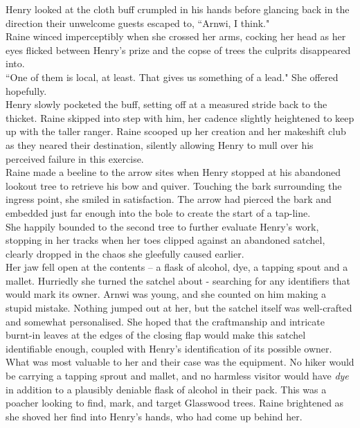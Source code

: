 Henry looked at the cloth buff crumpled in his hands before glancing back in the direction their unwelcome guests escaped to, ``Arnwi, I think."\\
Raine winced imperceptibly when she crossed her arms, cocking her head as her eyes flicked between Henry's prize and the copse of trees the culprits disappeared into.\\
``One of them is local, at least. That gives us something of a lead." She offered hopefully.\\
Henry slowly pocketed the buff, setting off at a measured stride back to the thicket. Raine skipped into step with him, her cadence slightly heightened to keep up with the taller ranger.
Raine scooped up her creation and her makeshift club as they neared their destination, silently allowing Henry to mull over his perceived failure in this exercise.\\

Raine made a beeline to the arrow sites when Henry stopped at his abandoned lookout tree to retrieve his bow and quiver.
Touching the bark surrounding the ingress point, she smiled in satisfaction. The arrow had pierced the bark and embedded just far enough into the bole to create the start of a tap-line.\\
She happily bounded to the second tree to further evaluate Henry's work, stopping in her tracks when her toes clipped against an abandoned satchel, clearly dropped in the chaos she gleefully caused earlier.\\

Her jaw fell open at the contents -- a flask of alcohol, dye, a tapping spout and a mallet. 
Hurriedly she turned the satchel about - searching for any identifiers that would mark its owner. 
Arnwi was young, and she counted on him making a stupid mistake.
Nothing jumped out at her, but the satchel itself was well-crafted and somewhat personalised.
She hoped that the craftmanship and intricate burnt-in leaves at the edges of the closing flap would make this satchel identifiable enough, coupled with Henry's identification of its possible owner.\\

What was most valuable to her and their case was the equipment.
No hiker would be carrying a tapping sprout and mallet, and no harmless visitor would have \textit{dye} in addition to a plausibly deniable flask of alcohol in their pack. 
This was a poacher looking to find, mark, and target Glasswood trees.
Raine brightened as she shoved her find into Henry's hands, who had come up behind her.\\

